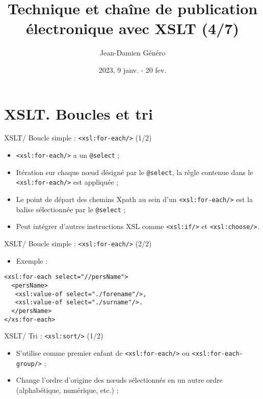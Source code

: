 \documentclass{beamer}
\title{Technique et chaîne de publication électronique avec XSLT (4/7)}
\date{2023, 9 janv. - 20 fev.}
\author{Jean-Damien Généro}
\institute{École nationale des chartes -- M2 TNAH}
\begin{document}
    \maketitle

    \section{XSLT. Boucles et tri}

    \begin{frame}{XSLT/ Boucle simple : \texttt{<xsl:for-each/>} (1/2)}
        \Large
        \begin{itemize}
            \item \texttt{<xsl:for-each/>} a un \texttt{@select} ;
            \bigskip
            \item Itération sur chaque n\oe ud désigné par le \texttt{@select}, la règle contenue dans le \texttt{<xsl:for-each/>} est appliquée ;
            \bigskip
            \item Le point de départ des chemins Xpath au sein d'un \texttt{<xsl:for-each/>} est la balise sélectionnée par le \texttt{@select} ;
            \bigskip
            \item Peut intégrer d'autres instructions XSL comme \texttt{<xsl:if/>} et \texttt{<xsl:choose/>}.
        \end{itemize}
    \end{frame}

    \begin{frame}[fragile]{XSLT/ Boucle simple : \texttt{<xsl:for-each/>} (2/2)}
        \Large
        \begin{itemize}
            \item Exemple :
        \end{itemize}
        \begin{verbatim}
<xsl:for-each select="//persName">
  <persName>
   <xsl:value-of select="./forename"/>,
   <xsl:value-of select="./surname"/>.
  </persName>
</xs:for-each>
        \end{verbatim}
    \end{frame}

    \begin{frame}{XSLT/ Tri : \texttt{<xsl:sort/>} (1/2)}
        \Large
        \begin{itemize}
            \item S'utilise comme premier enfant de \texttt{<xsl:for-each/>} ou \texttt{<xsl:for-each-group/>} ;
            \bigskip
            \item Change l'ordre d'origine des n\oe uds sélectionnés en un autre ordre (alphabétique, numérique, etc.) ;
        \end{itemize}
    \end{frame}
\end{document}
